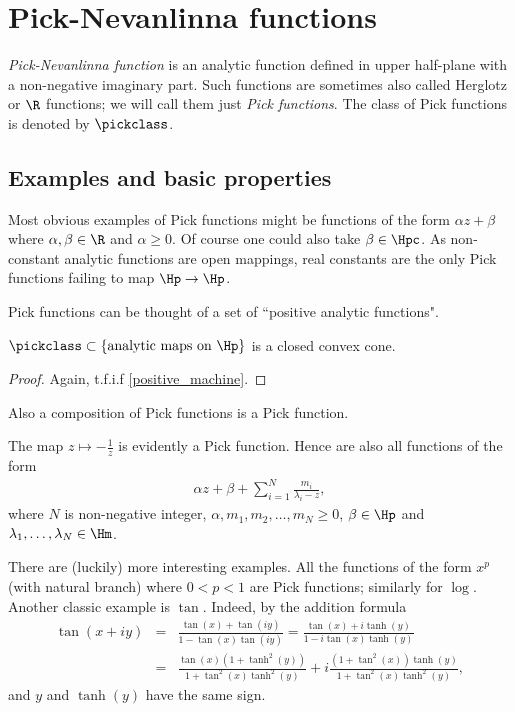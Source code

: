 \chapter{Pick-Nevanlinna functions}

\textit{Pick-Nevanlinna function} is an analytic function defined in upper half-plane with a non-negative imaginary part. Such functions are sometimes also called Herglotz or $\R$ functions; we will call them just \textit{Pick functions}. The class of Pick functions is denoted by $\pickclass$.

\section{Examples and basic properties}

Most obvious examples of Pick functions might be functions of the form $\alpha z + \beta$ where $\alpha, \beta \in \R$ and $\alpha \geq 0$. Of course one could also take $\beta \in \Hpc$. As non-constant analytic functions are open mappings, real constants are the only Pick functions failing to map $\Hp \to \Hp$.

Pick functions can be thought of a set of ``positive analytic functions".

\begin{lause}
	$\pickclass \subset \{\text{analytic maps on $\Hp$} \}$ is a closed convex cone.
\end{lause}
\begin{proof}
	Again, t.f.i.f \ref{positive_machine}.
\end{proof}

Also a composition of Pick functions is a Pick function.

The map $z \mapsto -\frac{1}{z}$ is evidently a Pick function. Hence are also all functions of the form
\begin{align*}
	\alpha z + \beta + \sum_{i = 1}^{N} \frac{m_{i}}{\lambda_{i}- z},
\end{align*}
where $N$ is non-negative integer, $\alpha, m_{1}, m_{2}, \ldots, m_{N} \geq 0$, $\beta \in \Hp$ and $\lambda_{1}, \ldots, \lambda_{N} \in \Hm$.

There are (luckily) more interesting examples. All the functions of the form $x^{p}$ (with natural branch) where $0 < p < 1$ are Pick functions; similarly for $\log$. Another classic example is $\tan$. Indeed, by the addition formula
\begin{eqnarray*}
	\tan(x + i y) &=& \frac{\tan(x) + \tan(i y)}{1 - \tan(x) \tan(i y)} = \frac{\tan(x) + i \tanh(y)}{1 - i \tan(x) \tanh(y)} \\
	&=& \frac{\tan(x)(1 + \tanh^2(y))}{1 + \tan^2(x) \tanh^2(y)} + i \frac{(1 + \tan^2(x))\tanh(y)}{1 + \tan^2(x) \tanh^2(y)},
\end{eqnarray*}
and $y$ and $\tanh(y)$ have the same sign.

